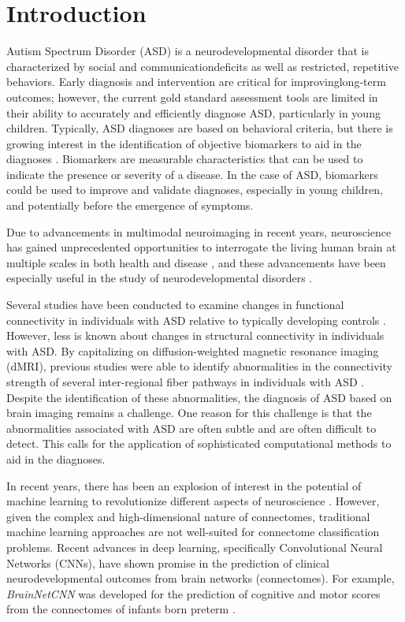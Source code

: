 
\section{Introduction}

Autism Spectrum Disorder (ASD) is a neurodevelopmental disorder that is characterized by social 
and communicationdeficits as well as restricted, repetitive behaviors. Early diagnosis and 
intervention are critical for improvinglong-term outcomes; however, the current gold standard 
assessment tools are limited in their ability to accurately and efficiently diagnose ASD, 
particularly in young children. Typically, ASD diagnoses are based on behavioral criteria, 
but there is growing interest in the identification of objective biomarkers to aid in the 
diagnoses \cite{Shen.2019.advances_biomarkers}. Biomarkers are measurable characteristics that 
can be used to indicate the presence or severity of a disease. In the case of ASD, biomarkers 
could be used to improve and validate diagnoses, especially in young children, and potentially 
before the emergence of symptoms.

Due to advancements in multimodal neuroimaging in recent years, neuroscience has gained 
unprecedented opportunities to interrogate the living human brain at multiple scales in both 
health and disease \cite{Hong.2019}, and these advancements have been especially useful in the 
study of neurodevelopmental disorders \cite{Nunes.2019}.

Several studies have been conducted to examine changes in functional connectivity in individuals 
with ASD relative to typically developing controls \cite{Lau.2019, Williams.2013}. However, less 
is known about changes in structural connectivity in individuals with ASD. By capitalizing on 
diffusion-weighted magnetic resonance imaging (dMRI), previous studies were able to identify 
abnormalities in the connectivity strength of several inter-regional fiber pathways in 
individuals with ASD \cite{DAlbis.2018}. Despite the identification of these abnormalities, the 
diagnosis of ASD based on brain imaging remains a challenge. One reason for this challenge is 
that the abnormalities associated with ASD are often subtle and are often difficult to detect. 
This calls for the application of sophisticated computational methods to aid in the diagnoses.

In recent years, there has been an explosion of interest in the potential of machine learning to 
revolutionize different aspects of neuroscience \cite{Abos.2017.ML_Parkinsons,Vogt.2018.MLneuro}. 
However, given the complex and high-dimensional nature of connectomes, traditional machine 
learning approaches are not well-suited for connectome classification problems. Recent advances 
in deep learning, specifically Convolutional Neural Networks (CNNs), have shown promise in the 
prediction of clinical neurodevelopmental outcomes from brain networks (connectomes). For 
example, \textit{BrainNetCNN} was developed for the prediction of cognitive and motor scores 
from the connectomes of infants born preterm \cite{Kawahara.2017.brainnetcnn}.


